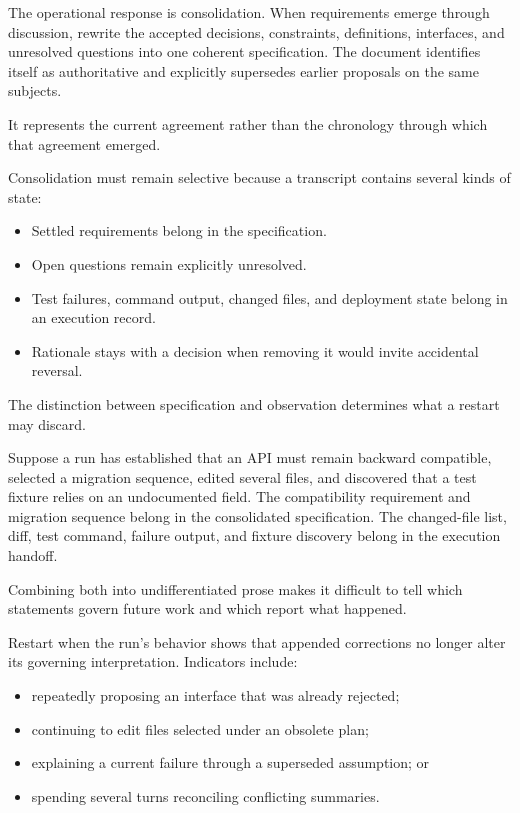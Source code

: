 The operational response is consolidation. When requirements emerge through discussion, rewrite the accepted decisions, constraints, definitions, interfaces, and unresolved questions into one coherent specification. The document identifies itself as authoritative and explicitly supersedes earlier proposals on the same subjects.

It represents the current agreement rather than the chronology through which that agreement emerged.


Consolidation must remain selective because a transcript contains several kinds of state:

\begin{itemize}
\tightlist
\item
  Settled requirements belong in the specification.
\item
  Open questions remain explicitly unresolved.
\item
  Test failures, command output, changed files, and deployment state belong in an execution record.
\item
  Rationale stays with a decision when removing it would invite accidental reversal.
\end{itemize}

The distinction between specification and observation determines what a restart may discard.

Suppose a run has established that an API must remain backward compatible, selected a migration sequence, edited several files, and discovered that a test fixture relies on an undocumented field. The compatibility requirement and migration sequence belong in the consolidated specification. The changed-file list, diff, test command, failure output, and fixture discovery belong in the execution handoff.

Combining both into undifferentiated prose makes it difficult to tell which statements govern future work and which report what happened.


Restart when the run's behavior shows that appended corrections no longer alter its governing interpretation. Indicators include:

\begin{itemize}
\tightlist
\item
  repeatedly proposing an interface that was already rejected;
\item
  continuing to edit files selected under an obsolete plan;
\item
  explaining a current failure through a superseded assumption; or
\item
  spending several turns reconciling conflicting summaries.
\end{itemize}

